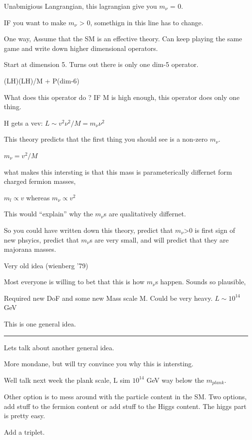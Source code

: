 {Unabmigious Langrangian,  this lagrangian give you $m_\nu$ = 0.

IF you want to make $m_\nu$ > 0, somethign in this line has to change. 

One way, Assume that the SM is an effective theory. 
  Can keep playing the same game and write down higher dimensional operators. 

  Start at dimension 5. 
  Turns out there is only one dim-5 operator. 


 (LH)(LH)/M + P(dim-6) 

What does this operator do ?
IF M is high enough, this operator does only one thing. 

H gets a vev:   $L \sim  v^2 \nu^2 / M   = m_\nu  \nu^2$

This theory predicts that the first thing you should see is a non-zero $m_\nu$. 

 $m_\nu = v^2 / M$

what makes this intersting is that this mass is parameterically differnet form charged fermion masses, 

 $m_l \propto v$   whereas $m_\nu \propto v^2$

This would ``explain'' why the $m_\nu$s are qualitatively differnet. 

So you could have written down this theory,   predict that $m_\nu$>0 is first sign of new phsyics, predict that $m_\nu$s are very small, and will predict that they are majorana masses. 

Very old idea (wienberg '79) 

Most everyone is willing to bet that this is how $m_\nu$s happen. 
Sounds so plausible, 

Required new DoF and some new Mass scale M.  
Could be very heavy.
$L \sim 10^{14}$ GeV 


This is one general idea. 

\noindent\rule{\textwidth}{1pt} 

Lets talk about another general idea. 

More mondane, but will try convince you why this is intersting. 

Well talk next week the plank scale, L sim $10^{14}$ GeV way below the $m_{plank}$. 

Other option is to mess around with the particle content in the SM.
 Two options, add stuff to the fermion content or add stuff to the Higgs content. 
 The higgs part is pretty easy. 

Add a triplet. 

}
